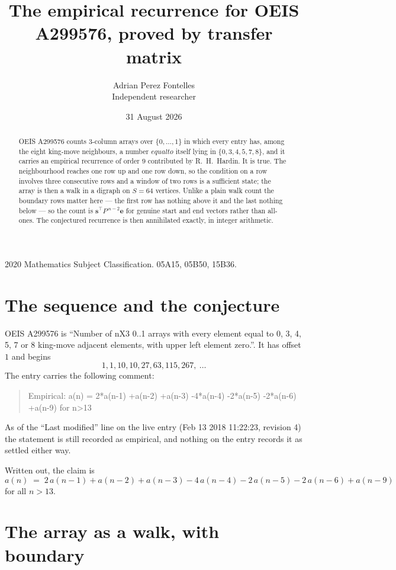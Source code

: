 \documentclass[11pt,a4paper]{article}
\title{The empirical recurrence for OEIS A299576, proved by transfer matrix}
\author{Adrian Perez Fontelles\\ \small Independent researcher}
\date{31 August 2026}
\theoremstyle{plain}
\theoremstyle{definition}
\begin{document}
\maketitle

\begin{abstract}
OEIS A299576 counts $3$-column arrays over $\{0,\dots,1\}$ in which every entry has,
among the eight king-move neighbours, a number $equal to$ itself lying in $\{0,3,4,5,7,8\}$, and it carries an empirical
recurrence of order $9$ contributed by R.~H.~Hardin. It is true. The neighbourhood
reaches one row up and one row down, so the condition on a row involves three consecutive
rows and a window of two rows is a sufficient state; the array is then a walk in a digraph
on $S=64$ vertices. Unlike a plain walk count the boundary rows matter here --- the first
row has nothing above it and the last nothing below --- so the count is
$\mathbf{s}^{\!\top}P^{\,n-2}\mathbf{e}$ for genuine start and end vectors rather than
all-ones. The conjectured recurrence is then annihilated exactly, in integer arithmetic.
\end{abstract}

\noindent\small 2020 Mathematics Subject Classification. 05A15, 05B50, 15B36.\normalsize

\section{The sequence and the conjecture}

OEIS A299576 is ``Number of nX3 0..1 arrays with every element equal to 0, 3, 4, 5, 7 or 8 king-move adjacent elements, with upper left element zero.''. It has offset
$1$ and begins
\[
1, 1, 10, 10, 27, 63, 115, 267,\ \dots
\]
The entry carries the following comment:
\begin{quote}\small
Empirical: a(n) = 2*a(n-1) +a(n-2) +a(n-3) -4*a(n-4) -2*a(n-5) -2*a(n-6) +a(n-9) for n>13
\end{quote}
As of the ``Last modified'' line on the live entry (Feb 13 2018 11:22:23, revision
4) the statement is still recorded as empirical, and nothing on the entry
records it as settled either way.

Written out, the claim is
\begin{equation}\label{eq:conj}
a(n)\;=\;2\,a(n-1) + a(n-2) + a(n-3) - 4\,a(n-4) - 2\,a(n-5) - 2\,a(n-6) + a(n-9)
\end{equation}
for all $n>13$.

\section{The array as a walk, with boundary}
\end{document}
